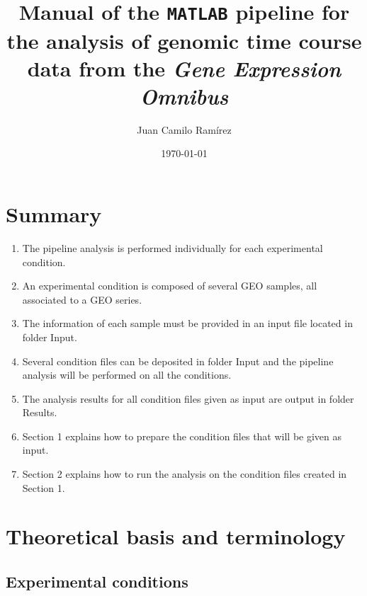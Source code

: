 \documentclass[final,letterpaper,twoside,12pt]{article}
\title{Manual of the \texttt{MATLAB} pipeline for the analysis of genomic time course data from the \textit{Gene Expression Omnibus}}
\author{Juan Camilo Ram\'{i}rez}
\date{\today}
\begin{document}
\maketitle

\tableofcontents

\listoffigures

\listoftables

\section{Summary}

\begin{enumerate}

\item The pipeline analysis is performed individually for each experimental condition.

\item An experimental condition is composed of several GEO samples, all associated to a GEO series.

\item The information of each sample must be provided in an input file located in folder Input.

\item Several condition files can be deposited in folder Input and the pipeline analysis will be performed on all the conditions.

\item The analysis results for all condition files given as input are output in folder Results.

\item Section 1 explains how to prepare the condition files that will be given as input.

\item Section 2 explains how to run the analysis on the condition files created in Section 1. 

\end{enumerate}




\section{Theoretical basis and terminology}
\label{section:theory_and_terminology}

\subsection{Experimental conditions}
\end{document}
